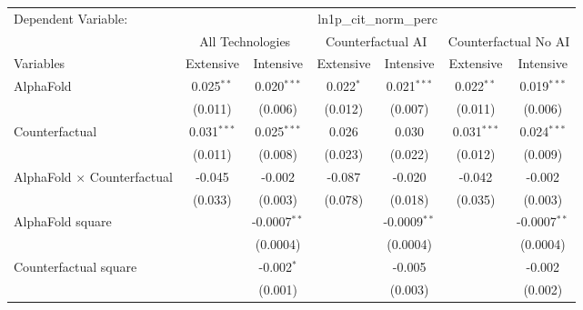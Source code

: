 \begingroup
\centering
\begin{tabular}{lcccccc}
   \tabularnewline \midrule \midrule
   Dependent Variable: & \multicolumn{6}{c}{ln1p\_cit\_norm\_perc}\\
 & \multicolumn{2}{c}{All Technologies} & \multicolumn{2}{c}{Counterfactual AI} & \multicolumn{2}{c}{Counterfactual No AI} \\
\cmidrule(lr){1-1}\cmidrule(lr){2-3} \cmidrule(lr){4-5} \cmidrule(lr){6-7}
Variables & \multicolumn{1}{c}{Extensive} & \multicolumn{1}{c}{Intensive} & \multicolumn{1}{c}{Extensive} & \multicolumn{1}{c}{Intensive} & \multicolumn{1}{c}{Extensive} & \multicolumn{1}{c}{Intensive} \\
\cmidrule(lr){1-1}\cmidrule(lr){2-2} \cmidrule(lr){3-3} \cmidrule(lr){4-4} \cmidrule(lr){5-5} \cmidrule(lr){6-6} \cmidrule(lr){7-7}
   AlphaFold                          & 0.025$^{**}$  & 0.020$^{***}$  & 0.022$^{*}$ & 0.021$^{***}$  & 0.022$^{**}$  & 0.019$^{***}$\\   
                                      & (0.011)       & (0.006)        & (0.012)     & (0.007)        & (0.011)       & (0.006)\\   
   Counterfactual                     & 0.031$^{***}$ & 0.025$^{***}$  & 0.026       & 0.030          & 0.031$^{***}$ & 0.024$^{***}$\\   
                                      & (0.011)       & (0.008)        & (0.023)     & (0.022)        & (0.012)       & (0.009)\\   
   AlphaFold $\times$ Counterfactual  & -0.045        & -0.002         & -0.087      & -0.020         & -0.042        & -0.002\\   
                                      & (0.033)       & (0.003)        & (0.078)     & (0.018)        & (0.035)       & (0.003)\\   
   AlphaFold square                   &               & -0.0007$^{**}$ &             & -0.0009$^{**}$ &               & -0.0007$^{**}$\\   
                                      &               & (0.0004)       &             & (0.0004)       &               & (0.0004)\\   
   Counterfactual square              &               & -0.002$^{*}$   &             & -0.005         &               & -0.002\\   
                                      &               & (0.001)        &             & (0.003)        &               & (0.002)\\   

\end{tabular}
